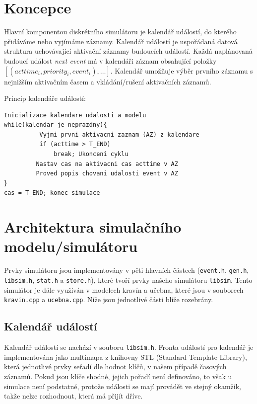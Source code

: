 \documentclass[12pt,a4paper,titlepage,final]{article}
\begin{document}
\section{Koncepce}

Hlavní komponentou diskrétního simulátoru je kalendář událostí, do kterého přidáváme nebo vyjímáme záznamy. 
Kalendář událostí je uspořádaná datová struktura uchovávající aktivační záznamy budoucích událostí. Každá naplánovaná budoucí událost \emph{next event} má v kalendáři záznam obsahující položky $[(acttime_{i}, priority_{i}, event_{i}), \dots]$. Kalendář umožňuje výběr prvního záznamu s nejnižším aktivačním časem a vkládání/rušení aktivačních záznamů.

Princip kalendáře událostí:
\begin{lstlisting}
Inicializace kalendare udalosti a modelu
while(kalendar je neprazdny){
          Vyjmi prvni aktivacni zaznam (AZ) z kalendare
          if (acttime > T_END)
              break; Ukonceni cyklu
         Nastav cas na aktivacni cas acttime v AZ
         Proved popis chovani udalosti event v AZ
}
cas = T_END; konec simulace
\end{lstlisting}

\section{Architektura simulačního modelu/simulátoru}

Prvky simulátoru jsou implementovány v pěti hlavních částech (\texttt{event.h}, \texttt{gen.h}, \texttt{libsim.h}, \texttt{stat.h} a \texttt{store.h}), které tvoří prvky našeho simulátoru \texttt{libsim}. Tento simulátor je dále využíván v modelech kravín a učebna, které jsou v souborech \texttt{kravin.cpp} a \texttt{ucebna.cpp}. Níže jsou jednotlivé části blíže rozebrány.

\subsection{Kalendář událostí}

Kalendář událostí se nachází v souboru \texttt{libsim.h}. Fronta událostí pro kalendář je implementována jako multimapa z knihovny STL (Standard Template Library), která jednotlivé prvky seřadí dle hodnot klíčů, v našem případě časových záznamů. Pokud jsou klíče shodné, jejich pořadí není definováno, to však u simulace není podstatné, protože události se mají provádět ve stejný okamžik, takže nelze rozhodnout, která má přijít dříve.
\end{document}
